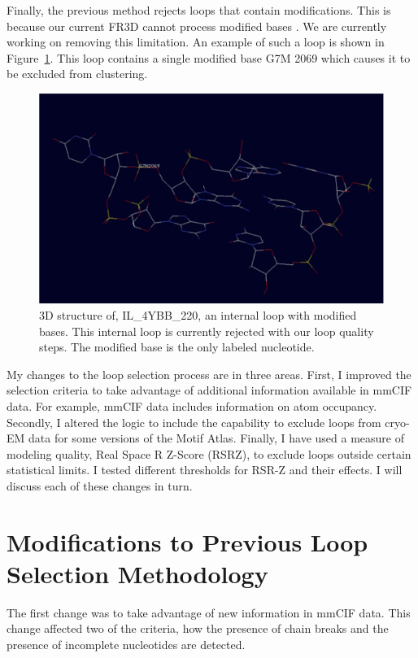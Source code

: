 Finally, the previous method rejects loops that contain modifications. This is
because our current FR3D cannot process modified bases \cite{Sarver2008a}. We are
currently working on removing this limitation. An example of such a loop is
shown in Figure~\ref{fig:modified-loop}. This loop contains a single modified
base G7M 2069 which causes it to be excluded from clustering.

\begin{figure}
  \includegraphics[width=\textwidth]{chapter-5/figs/loops/IL-4YBB-220}
  \caption{3D structure of, IL\_4YBB\_220, an internal loop with modified bases.
  This internal loop is currently rejected with our loop quality steps. The
modified base is the only labeled nucleotide.}
  \label{fig:modified-loop}
\end{figure}

My changes to the loop selection process are in three areas. First, I improved
the selection criteria to take advantage of additional information available in
mmCIF data. For example, mmCIF data includes information on atom occupancy.
Secondly, I altered the logic to include the capability to exclude loops from
cryo-EM data for some versions of the Motif Atlas. Finally, I have used a
measure of modeling quality, Real Space R Z-Score (RSRZ), to exclude loops
outside certain statistical limits. I tested different thresholds for RSR-Z and
their effects. I will discuss each of these changes in turn.

\section{Modifications to Previous Loop Selection Methodology}

The first change was to take advantage of new information in mmCIF data. This
change affected two of the criteria, how the presence of chain breaks and
the presence of incomplete nucleotides are detected.

